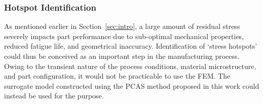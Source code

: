 \subsubsection{Hotspot Identification}
\label{subsub:hotspot}

As mentioned earlier in Section~\ref{sec:intro}, a large amount of residual stress severely impacts part
performance due to sub-optimal mechanical properties, reduced fatigue life, and geometrical inaccuracy. 
Identification of `stress hotspots' could thus be conceived as an important step in the manufacturing process.
Owing to the transient nature of the process conditions, material microstructure, and part configuration,
it would not be practicable to use the FEM. The surrogate model constructed using the PCAS method
proposed in this work could instead be used for the purpose.

